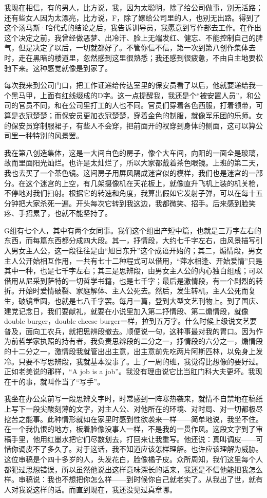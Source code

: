我现在相信，有的男人，比方说，我，因为太聪明，除了给公司做事，别无活路；还有些女人因为太漂亮，比方说，F，除了嫁给公司里的人，也别无出路。得到了这个汤马斯·哈代式的结论之后，我告诉训导员，我愿意到写作部去工作。在作出这个决定之前，我曾经做恶梦、出冷汗、脸上无端发红、健忘、不能控制自己的脾气，但是决定了以后，一切就都好了。不管你信不信，第一次到第八创作集体去时，走在黑暗的楼道里，忽然感到这里很熟悉；我还感到很疲惫，不由自主地要松驰下来。这种感觉就像是到家了。 

每次我来到公司门口，把工作证递给传达室里的保安员看了以后，他就要递给我一个黑马甲，上面有红线缀成的D字。这一点提醒我，我还是个“被安置人员”，和公司的官员不同，和在公司里打工的人也不同。官员们穿着各色西服，打着领带，可算是衣冠楚楚；而保安员更加衣冠楚楚，穿着金色的制服，就像军乐团的乐师。女的保安员穿制服裙子，有些人不会穿，把前面开的衩穿到身体的侧面，这可以算公司里一种特别的风景罢。 

我在第八创造集体，这是一大间白色的房子，像个大车间，向阳的一面全是玻璃，故而里面阳光灿烂。也许是太灿烂了，所以大家都戴着茶色眼镜。上班的第二天，我也去买了一个茶色镜。这间房子用屏风隔成迷宫似的模样，我们也是迷宫的一部分。在这个迷宫的上空，有几架摄像机在天花板上，就像直升飞机上装的机关枪，不停地对我们扫射。根据它的转速和角度，我算出假如它发射子弹，可以在每十五分钟把大家杀死一遍。开头每次它转到我这边，我都微笑、招手。后来感到脸笑疼、手招累了，也就不能坚持了。 

G组有七个人，其中有两个女同事。我们这个组出产短中篇，也就是三万字左右的东西，而每篇东西都分成四大段。其一，抒情段，大约七千字左右，由风景描写引入男女主人公，这一段往往是由“旭日东升”这个成语开始的；其二，煽情段，男女主人公开始相互作用，一共有七十二种程式可以借用，“萍水相逢、开始爱情”只是其中一种，也是七千字左右；其三是思辨段，由男女主人公的内心独白组成；可以借用从尼采到萨特的一切哲学书籍，也是七千字；最后是激情段，有一个剧烈的转折。开始时爱情破裂、家庭解体、主人公死去。然后，发生转机，主人公死而复生，破镜重圆，也就是七八千字罢。每月一篇，登到大型文艺刊物上。到了国庆、建党记念日，我们要献礼，就要在小说里加入第二抒情段、第二煽情段，就像double burger，double cheese burger一样，拉到五万字。什么时候上级说文艺要普及，面向工农兵，就把思辨段撤去。顺便说一句，这种事最对我的胃口。因为作为前哲学家执照的持有者，我负责思辨段的二分之一，抒情段的六分之一，煽情段的十二分之一，激情段我就管出出主意，出主意前先吃两片阿斯匹林，以免身上发冷。只要不写思辨段，我就基本没事了。上了一周的班，我觉得比想像的要好过。正如老美说的那样，“A job is a job”。我没有理由说它比当肛门科大夫更坏。我现在干的事，就叫作当了“写手”。 

我坐在办公桌前写一段思辨文字时，时常感到一阵寒热袭来，就情不自禁地在稿纸上写下一段尖酸刻薄的文字，对主人公、对他所在的环境、对时局、对一切都极尽挖苦之能事。此种情形就如在家里时感到性欲袭来一样——简单地说，我坐不住。在一个我仇恨的地方，板着脸像没事人一样，不是我的一贯作风。这段文字到了审稿手里，他用红墨水把它们尽数划去，打回来让我重写。他还说：真叫调皮——可惜你调皮不了多久了。对于这话，我不知道应该怎样理解。也许应该理解为威胁。这位审稿是个四十多岁的人，头发花白，脸像橘子皮。众所周知，我们这里每个人都犯过思想错误，所以虽然他说出这样意味深长的话来，我还是不信他能把我怎么样。审稿说：我也不想把你怎么样——到时候你自己就老实了。从我出了世，就有人对我说这样的话。而直到现在，我还没见过真章哪。 

